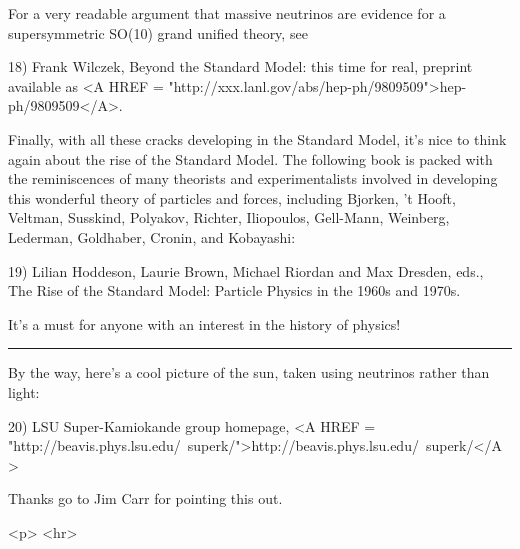 For a very readable argument that massive neutrinos are evidence for a
supersymmetric SO(10) grand unified theory, see

18) Frank Wilczek, Beyond the Standard Model: this time for real, 
preprint available as
<A HREF = "http://xxx.lanl.gov/abs/hep-ph/9809509">hep-ph/9809509</A>.

Finally, with all these cracks developing in the Standard Model, it's nice
to think again about the rise of the Standard Model.  The following book
is packed with the reminiscences of many theorists and experimentalists
involved in developing this wonderful theory of particles and forces,
including Bjorken, 't Hooft, Veltman, Susskind, Polyakov, Richter,
Iliopoulos, Gell-Mann, Weinberg, Lederman, Goldhaber, Cronin, and
Kobayashi:

19) Lilian Hoddeson, Laurie Brown, Michael Riordan and Max Dresden,
eds., The Rise of the Standard Model: Particle Physics in the 1960s and
1970s.  

It's a must for anyone with an interest in the history of physics!

\par\noindent\rule{\textwidth}{0.4pt}
By the way, here's a cool picture of the sun, taken using neutrinos
rather than light:

20) LSU Super-Kamiokande group homepage, 
<A HREF = "http://beavis.phys.lsu.edu/~superk/">http://beavis.phys.lsu.edu/~superk/</A>

Thanks go to Jim Carr for pointing this out.

<p> <hr>



